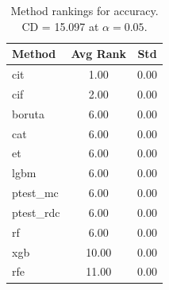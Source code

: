 \begin{table}[h]
\centering
\caption{Method rankings for accuracy. CD = 15.097 at $\alpha=0.05$.}
\label{tab:ranks_accuracy}
\begin{tabular}{lcc}
\toprule
Method & Avg Rank & Std \\
\midrule
cit & 1.00 & 0.00 \\
cif & 2.00 & 0.00 \\
boruta & 6.00 & 0.00 \\
cat & 6.00 & 0.00 \\
et & 6.00 & 0.00 \\
lgbm & 6.00 & 0.00 \\
ptest_mc & 6.00 & 0.00 \\
ptest_rdc & 6.00 & 0.00 \\
rf & 6.00 & 0.00 \\
xgb & 10.00 & 0.00 \\
rfe & 11.00 & 0.00 \\
\bottomrule
\end{tabular}
\end{table}